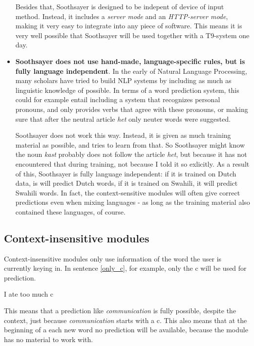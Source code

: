 \documentclass[12pt]{article}
\begin{document}
\begin{itemize}
Besides that, Soothsayer is designed to be indepent of device of input method. Instead, it includes a \emph{server mode} and an \emph{HTTP-server mode}, making it very easy to integrate into any piece of software. This means it is very well possible that Soothsayer will be used together with a T9-system one day.

\item \textbf{Soothsayer does not use hand-made, language-specific rules, but is fully language independent}. In the early of Natural Language Processing, many scholars have tried to build NLP systems by including as much as linguistic knowledge of possible. In terms of a word prediction system, this could for example entail including a system that recognizes personal pronouns, and only provides verbs that agree with these pronouns, or making sure that after the neutral article \emph{het} only neuter words were suggested. 

Soothsayer does not work this way. Instead, it is given as much training material as possible, and tries to learn from that. So Soothsayer might know the noun \emph{kast} probably does not follow the article \emph{het}, but because it has not encountered that during training, not because I told it so exlicitly. As a result of this, Soothsayer is fully language independent: if it is trained on Dutch data, is will predict Dutch words, if it is trained on Swahili, it will predict Swahili words. In fact, the context-sensitive modules will often give correct predictions even when mixing languages - as long as the training material also contained these languages, of course.


\end{itemize}

\subsection{Context-insensitive modules} \label{ci}

Context-insensitive modules only use information of the word the user is currently keying in. In sentence \ref{only_c}, for example, only the c will be used for prediction. 

\begin{examples}
\item I ate too much c \label{only_c}
\end{examples}

This means that a prediction like \emph{communication} is fully possible, despite the context, just because \emph{communication} starts with a c. This also means that at the beginning of a each new word no prediction will be available, because the module has no material to work with.
\end{document}
